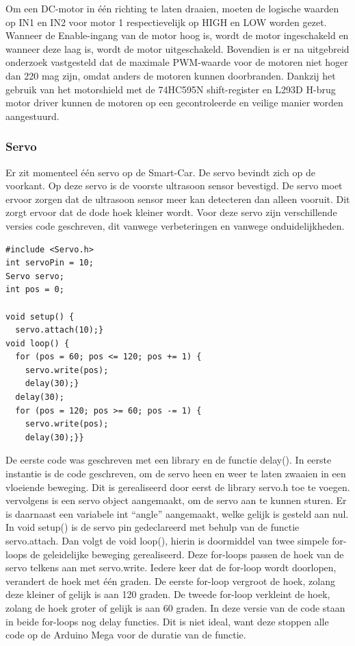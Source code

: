 Om een DC-motor in één richting te laten draaien, moeten de logische waarden op IN1 en IN2 voor motor 1 respectievelijk op HIGH en LOW worden gezet. Wanneer de Enable-ingang van de motor hoog is, wordt de motor ingeschakeld en wanneer deze laag is, wordt de motor uitgeschakeld. Bovendien is er na uitgebreid onderzoek vastgesteld dat de maximale \gls{PWM}-waarde voor de motoren niet hoger dan 220 mag zijn, omdat anders de motoren kunnen doorbranden. Dankzij het gebruik van het \gls{motorshield} met de 74HC595N\cite{shiftregister} \gls{shift-register} en L293D\cite{h-brug} \gls{H-brug} motor driver kunnen de motoren op een gecontroleerde en veilige manier worden aangestuurd.

\subsubsection{Servo}
Er zit momenteel één servo op de \gls{Smart-Car}. De servo bevindt zich op de voorkant. Op deze servo is de voorste ultrasoon sensor bevestigd. De servo moet ervoor zorgen dat de ultrasoon sensor meer kan detecteren dan alleen vooruit. Dit zorgt ervoor dat de dode hoek kleiner wordt. Voor deze servo zijn verschillende versies code geschreven, dit vanwege verbeteringen en vanwege onduidelijkheden. 

\begin{lstlisting}
#include <Servo.h>
int servoPin = 10;
Servo servo;
int pos = 0;   

void setup() {
  servo.attach(10);}
void loop() {
  for (pos = 60; pos <= 120; pos += 1) { 
    servo.write(pos);              
    delay(30);}
  delay(30);
  for (pos = 120; pos >= 60; pos -= 1) {
    servo.write(pos);              
    delay(30);}}
\end{lstlisting}

De eerste code was geschreven met een library en de functie delay(). In eerste instantie is de code geschreven, om de servo heen en weer te laten zwaaien in een vloeiende beweging. Dit is gerealiseerd door eerst de library servo.h toe te voegen. vervolgens is een servo object aangemaakt, om de servo aan te kunnen sturen. Er is daarnaast een variabele int “angle” aangemaakt, welke gelijk is gesteld aan nul.  In void setup() is de servo pin gedeclareerd met behulp van de functie servo.attach. 
Dan volgt de void loop(), hierin is doormiddel van twee simpele for-loops de geleidelijke beweging gerealiseerd. Deze for-loops passen de hoek van de servo telkens aan met servo.write. Iedere keer dat de for-loop wordt doorlopen, verandert de hoek met één graden. De eerste for-loop vergroot de hoek, zolang deze kleiner of gelijk is aan 120 graden. De tweede for-loop verkleint de hoek, zolang de hoek groter of gelijk is aan 60 graden. In deze versie van de code staan in beide for-loops nog delay functies. Dit is niet ideal, want deze stoppen alle code op de Arduino Mega\cite{ArduinoMEGA} voor de duratie van de functie. 

